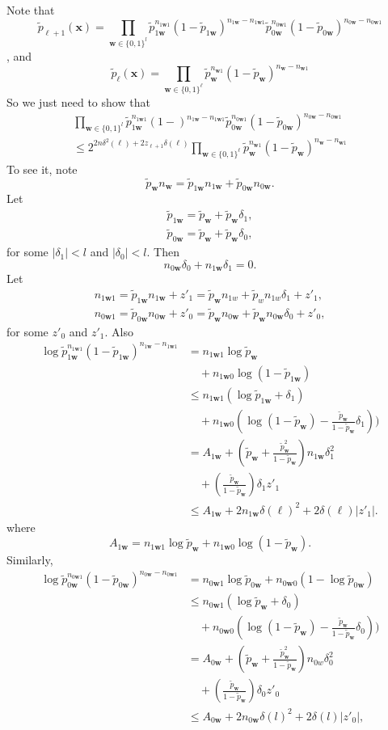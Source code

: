 \documentclass[conference,a4paper]{article}
\newcommand{\x}{\textbf{x}}
\newcommand{\w}{\textbf{w}}
\begin{document}
Note that 
\[
\tilde{p}_{\ell+1}(\x)=\prod_{\w\in\{0,1\}^l}
\tilde{p}_{1\w}^{n_{1\w 1}}(1-\tilde{p}_{1\w})^{{n_{1\w}-n_{1\w 1}}}
\tilde{p}_{0\w}^{n_{0\w 1}}(1-\tilde{p}_{0\w})^{{n_{0\w}-n_{0\w 1}}}
\], and 
\[
\tilde{p}_{\ell}(\x)=\prod_{\w\in\{0,1\}^\ell}
\tilde{p}_{\w}^{n_{\w 1}}(1-\tilde{p}_{\w})^{n_{\w}-n_{\w 1}}
\]
So we just need to show that
\begin{align*}
\prod_{\w\in\{0,1\}^l}
\tilde{p}_{1\w}^{n_{1\w 1}}(1-)^{n_{1\w}-n_{1\w 1}}
\tilde{p}_{0\w}^{n_{0\w 1}}(1-\tilde{p}_{0\w})^{n_{0\w}-n_{0\w 1}}
\\
\leq 
2^{2n\delta^2(\ell)+2z_{\ell+1}\delta(\ell)}\prod_{\w\in\{0,1\}^\ell}
\tilde{p}_{\w}^{n_{\w 1}}(1-\tilde{p}_{\w})^{n_{\w}-n_{\w 1}}
\end{align*}
To see it, note 
\[
\tilde{p}_\w n_\w=\tilde{p}_{1\w}n_{1\w}+\tilde{p}_{0\w}n_{0\w}.
\]
Let 
\begin{align*}
\tilde{p}_{1\w}=\tilde{p}_\w+\tilde{p}_\w\delta_1,\\
\tilde{p}_{0\w}=\tilde{p}_\w+\tilde{p}_\w\delta_0,
\end{align*}
 for some $|\delta_1|<l$ and $|\delta_0|<l$. Then
\[
n_{0\w}\delta_0+n_{1\w}\delta_1=0.
\]
Let
\begin{align*}
n_{1\w 1}=\tilde{p}_{1\w}n_{1\w}+z'_1=\tilde{p}_\w n_{1w}+\tilde{p}_wn_{1w}\delta_1+z'_1,\\
n_{0\w 1}=\tilde{p}_{0\w}n_{0\w}+z'_0=\tilde{p}_\w n_{0\w}+\tilde{p}_\w n_{0\w}\delta_0+z'_0,
\end{align*}
for some $z'_0$ and $z'_1$. Also
\begin{align*}
 \log \tilde{p}_{1\w}^{n_{1\w 1}}(1-\tilde{p}_{1\w})^{n_{1\w}-n_{1\w 1}}
 &=
 n_{1\w 1}\log \tilde{p}_{\w}\\
 &\quad+ n_{1\w 0}\log (1-\tilde{p}_{1\w})\\
 &\leq
  n_{1\w 1} (\log \tilde{p}_{1\w}+\delta_1)\\
  &\quad+n_{1\w 0} (\log (1-\tilde{p}_\w)-\frac{\tilde{p}_\w}{1-\tilde{p}_\w}\delta_1))\\
  &=A_{1\w}+(\tilde{p}_\w+\frac{\tilde{p}_\w^2}{1-\tilde{p}_\w})n_{1\w}\delta_1^2\\
  &\quad+(\frac{\tilde{p}_\w}{1-\tilde{p}_\w})\delta_1z'_1\\
  &\leq A_{1\w}+2n_{1\w}\delta(\ell)^2+2\delta(\ell)|z'_1|.
\end{align*}
where  
\[
A_{1\w}=n_{1\w 1}\log\tilde{p}_{\w}+n_{1\w 0}\log(1-\tilde{p}_\w).
\]
Similarly,
\begin{align*}
 \log \tilde{p}_{0\w}^{n_{0\w 1}}(1-\tilde{p}_{0\w})^{n_{0\w}-n_{0\w 1}}
 &=
 n_{0\w 1}\log \tilde{p}_{0\w}+ n_{0\w 0}(1-\log \tilde{p}_{0\w})\\
 &\leq
  n_{0\w 1} (\log \tilde{p}_{\w}+\delta_0)\\
  &\quad+ n_{0\w 0} (\log  (1-\tilde{p}_\w)-\frac{\tilde{p}_\w}{1-\tilde{p}_\w}\delta_0))\\
  &=A_{0\w}+(\tilde{p}_\w+\frac{\tilde{p}_\w^2}{1-\tilde{p}_\w})n_{0w}\delta_0^2\\
  &\quad+(\frac{\tilde{p}_\w}{1-\tilde{p}_\w})\delta_0z'_0\\
  &\leq A_{0\w}+2n_{0\w}\delta(l)^2+2\delta(l)|z'_0|,
\end{align*}
\end{document}
